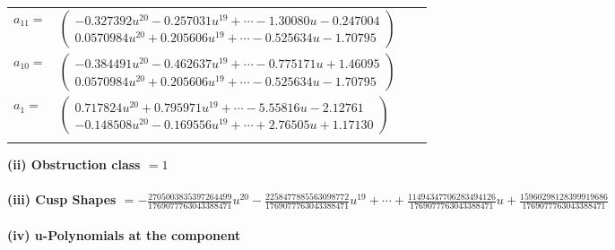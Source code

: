 \documentclass[1p]{elsarticle_modified}
\theoremstyle{definition}
\begin{document}
\begin{tabular}{m{7pt} m{180pt} m{7pt} m{180pt} }
\flushright $a_{11}=$&$\begin{pmatrix}-0.327392 u^{20}-0.257031 u^{19}+\cdots-1.30080 u-0.247004\\0.0570984 u^{20}+0.205606 u^{19}+\cdots-0.525634 u-1.70795\end{pmatrix}$ \\
\flushright $a_{10}=$&$\begin{pmatrix}-0.384491 u^{20}-0.462637 u^{19}+\cdots-0.775171 u+1.46095\\0.0570984 u^{20}+0.205606 u^{19}+\cdots-0.525634 u-1.70795\end{pmatrix}$ \\
\flushright $a_{1}=$&$\begin{pmatrix}0.717824 u^{20}+0.795971 u^{19}+\cdots-5.55816 u-2.12761\\-0.148508 u^{20}-0.169556 u^{19}+\cdots+2.76505 u+1.17130\end{pmatrix}$\\&\end{tabular}
\flushleft \textbf{(ii) Obstruction class $= 1$}\\~\\
\flushleft \textbf{(iii) Cusp Shapes $= -\frac{2705003835397264499}{1769077763043388471} u^{20}-\frac{2258477885563098772}{1769077763043388471} u^{19}+\cdots+\frac{11494347706283494126}{1769077763043388471} u+\frac{15960298128399919686}{1769077763043388471}$}\\~\\
\newpage\renewcommand{\arraystretch}{1}
\flushleft \textbf{(iv) u-Polynomials at the component}\newline \\
\end{document}
